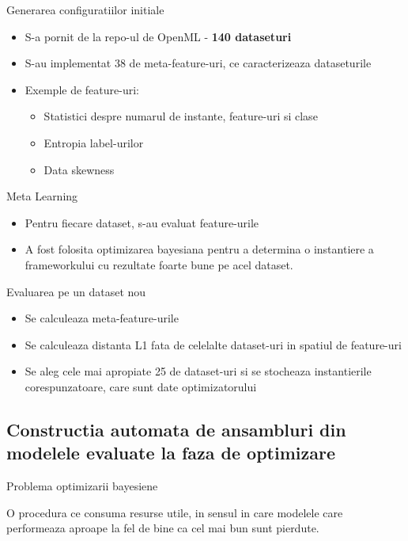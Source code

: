 \documentclass{beamer}
\begin{document}
	\begin{frame}{Generarea configuratiilor initiale}
		\begin{itemize}
			\item S-a pornit de la repo-ul de OpenML - \textbf{140 dataseturi}
			\item S-au implementat 38 de meta-feature-uri, ce caracterizeaza dataseturile
			\item Exemple de feature-uri:
				\begin{itemize}
					\item Statistici despre numarul de instante, feature-uri si clase
					\item Entropia label-urilor
					\item Data skewness
				\end{itemize}			
		\end{itemize}	
	\end{frame}

	\begin{frame}{Meta Learning}
		\begin{itemize}
			\item Pentru fiecare dataset, s-au evaluat feature-urile
			\item A fost folosita optimizarea bayesiana pentru a determina o instantiere a frameworkului cu rezultate foarte bune pe acel dataset.
		\end{itemize}	
	\end{frame}

	\begin{frame}{Evaluarea pe un dataset nou}
		\begin{itemize}
			\item Se calculeaza meta-feature-urile
			\item Se calculeaza distanta L1 fata de celelalte dataset-uri in spatiul de feature-uri
			\item Se aleg cele mai apropiate 25 de dataset-uri si se stocheaza instantierile corespunzatoare, care sunt date optimizatorului
		\end{itemize}	
	\end{frame}

\subsection{Constructia automata de ansambluri din modelele evaluate la faza de optimizare}

	\begin{frame}{Problema optimizarii bayesiene}
		\begin{center}
			O procedura ce consuma resurse utile, in sensul in care modelele care performeaza aproape la fel de bine ca cel mai bun sunt pierdute. 
		\end{center}	
	\end{frame}
\end{document}

